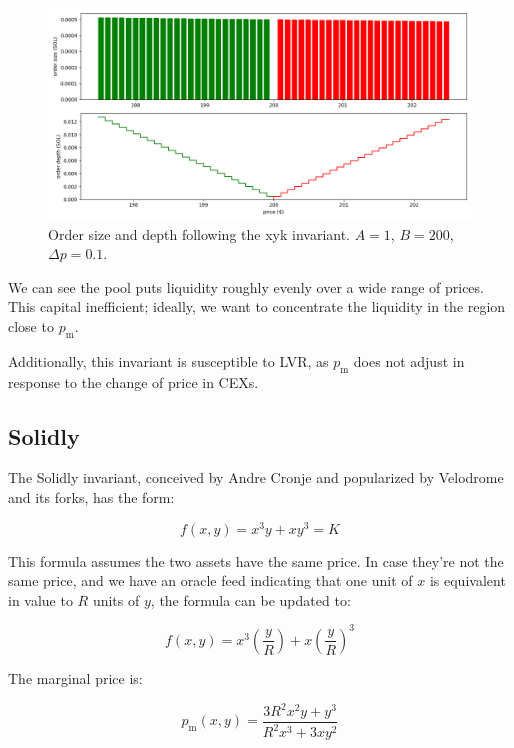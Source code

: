 \documentclass{article}
\begin{document}
\begin{figure}
  \includegraphics[width=\textwidth]{1-xyk.png}
  \caption{Order size and depth following the xyk invariant. $A = 1$, $B = 200$, $\Delta p = 0.1$.}
  \label{fig:1}
\end{figure}

We can see the pool puts liquidity roughly evenly over a wide range of prices. This capital inefficient; ideally, we want to concentrate the liquidity in the region close to $p_{\mathrm{m}}$.

Additionally, this invariant is susceptible to LVR, as $p_{\mathrm{m}}$ does not adjust in response to the change of price in CEXs.

\subsection{Solidly}

The Solidly invariant, conceived by Andre Cronje\supercite{andrecronjetwitter} and popularized by Velodrome and its forks,\supercite{velodrome,aerodrome} has the form:

\begin{equation}
  f(x, y) = x^3 y + x y^3 = K
\end{equation}

This formula assumes the two assets have the same price. In case they're not the same price, and we have an oracle feed indicating that one unit of $x$ is equivalent in value to $R$ units of $y$, the formula can be updated to:

\begin{equation}
  f(x, y) = x^3 \left( \frac{y}{R} \right) + x \left( \frac{y}{R} \right)^3
\end{equation}

The marginal price is:

\begin{equation}
  p_{\mathrm{m}}(x, y) = \frac{3 R^2 x^2 y + y^3}{R^2 x^3 + 3 x y^2}
\end{equation}
\end{document}
